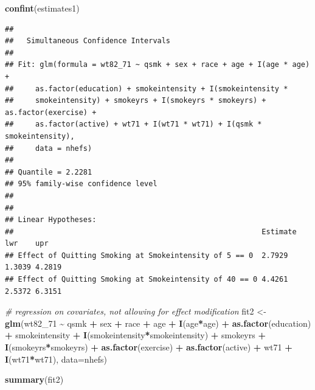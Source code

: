 \documentclass[
  10pt,
]{book}
\newenvironment{Shaded}{\begin{snugshade}}{\end{snugshade}}
\newcommand{\CommentTok}[1]{\textcolor[rgb]{0.56,0.35,0.01}{\textit{#1}}}
\newcommand{\DataTypeTok}[1]{\textcolor[rgb]{0.13,0.29,0.53}{#1}}
\newcommand{\DecValTok}[1]{\textcolor[rgb]{0.00,0.00,0.81}{#1}}
\newcommand{\KeywordTok}[1]{\textcolor[rgb]{0.13,0.29,0.53}{\textbf{#1}}}
\newcommand{\NormalTok}[1]{#1}
\newcommand{\OperatorTok}[1]{\textcolor[rgb]{0.81,0.36,0.00}{\textbf{#1}}}
\newcommand{\StringTok}[1]{\textcolor[rgb]{0.31,0.60,0.02}{#1}}
\begin{document}
\begin{Shaded}
\begin{Highlighting}[]
  \KeywordTok{confint}\NormalTok{(estimates1)}
\end{Highlighting}
\end{Shaded}

\begin{verbatim}
## 
##   Simultaneous Confidence Intervals
## 
## Fit: glm(formula = wt82_71 ~ qsmk + sex + race + age + I(age * age) + 
##     as.factor(education) + smokeintensity + I(smokeintensity * 
##     smokeintensity) + smokeyrs + I(smokeyrs * smokeyrs) + as.factor(exercise) + 
##     as.factor(active) + wt71 + I(wt71 * wt71) + I(qsmk * smokeintensity), 
##     data = nhefs)
## 
## Quantile = 2.2281
## 95% family-wise confidence level
##  
## 
## Linear Hypotheses:
##                                                         Estimate lwr    upr   
## Effect of Quitting Smoking at Smokeintensity of 5 == 0  2.7929   1.3039 4.2819
## Effect of Quitting Smoking at Smokeintensity of 40 == 0 4.4261   2.5372 6.3151
\end{verbatim}

\begin{Shaded}
\begin{Highlighting}[]
\CommentTok{\# regression on covariates, not allowing for effect modification}
\NormalTok{fit2 \textless{}{-}}\StringTok{ }\KeywordTok{glm}\NormalTok{(wt82\_}\DecValTok{71} \OperatorTok{\textasciitilde{}}\StringTok{ }\NormalTok{qsmk }\OperatorTok{+}\StringTok{ }\NormalTok{sex }\OperatorTok{+}\StringTok{ }\NormalTok{race }\OperatorTok{+}\StringTok{ }\NormalTok{age }\OperatorTok{+}\StringTok{ }\KeywordTok{I}\NormalTok{(age}\OperatorTok{*}\NormalTok{age) }\OperatorTok{+}\StringTok{ }\KeywordTok{as.factor}\NormalTok{(education)}
           \OperatorTok{+}\StringTok{ }\NormalTok{smokeintensity }\OperatorTok{+}\StringTok{ }\KeywordTok{I}\NormalTok{(smokeintensity}\OperatorTok{*}\NormalTok{smokeintensity) }\OperatorTok{+}\StringTok{ }\NormalTok{smokeyrs}
           \OperatorTok{+}\StringTok{ }\KeywordTok{I}\NormalTok{(smokeyrs}\OperatorTok{*}\NormalTok{smokeyrs) }\OperatorTok{+}\StringTok{ }\KeywordTok{as.factor}\NormalTok{(exercise) }\OperatorTok{+}\StringTok{ }\KeywordTok{as.factor}\NormalTok{(active)}
           \OperatorTok{+}\StringTok{ }\NormalTok{wt71 }\OperatorTok{+}\StringTok{ }\KeywordTok{I}\NormalTok{(wt71}\OperatorTok{*}\NormalTok{wt71), }\DataTypeTok{data=}\NormalTok{nhefs)}
  
\KeywordTok{summary}\NormalTok{(fit2)}
\end{Highlighting}
\end{Shaded}
\end{document}

